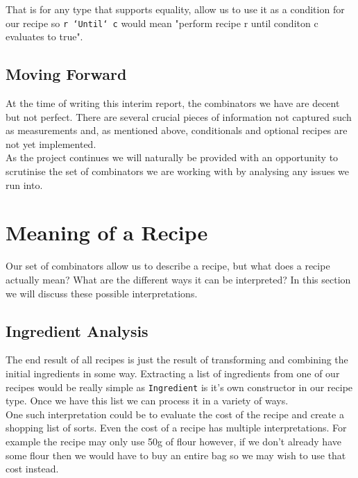 \documentclass[11pt]{article}
\begin{document}
    That is for any type that supports equality, allow us to use it as a
    condition for our recipe so \texttt{r `Until` c} would mean "perform
    recipe r until conditon c evaluates to true".

    \subsection{Moving Forward}
    At the time of writing this interim report, the combinators we
    have are decent but not perfect. There are several crucial pieces
    of information not captured such as measurements and, as mentioned
    above, conditionals and optional recipes are not yet implemented. \\

    As the project continues we will naturally be provided with an
    opportunity to scrutinise the set of combinators we are working
    with by analysing any issues we run into. \\

    \section{Meaning of a Recipe}

    Our set of combinators allow us to describe a recipe, but what does
    a recipe actually mean? What are the different ways it can be
    interpreted? In this section we will discuss these possible interpretations.
    
    \subsection{Ingredient Analysis}

    The end result of all recipes is just the result of transforming and combining
    the initial ingredients in some way. Extracting a list of ingredients from
    one of our recipes would be really simple as \texttt{Ingredient} is it's own
    constructor in our recipe type. Once we have this list we can process it in
    a variety of ways. \\
    
    One such interpretation could be to evaluate the cost of the recipe and create
    a shopping list of sorts. Even the cost of a recipe has multiple interpretations.
    For example the recipe may only use 50g of flour however, if we don't already have
    some flour then we would have to buy an entire bag so we may wish to use that cost
    instead. \\
\end{document}
